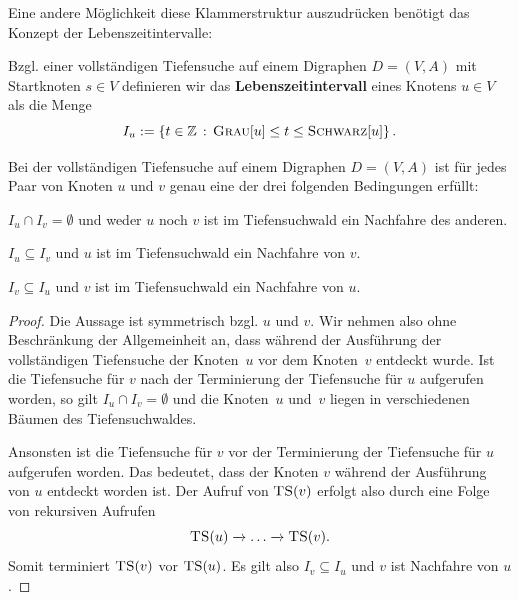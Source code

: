 \begin{bem} 	
Eine andere Möglichkeit diese Klammerstruktur auszudrücken benötigt das Konzept der Lebenszeitintervalle:
\end{bem}

\begin{defn}
	Bzgl. einer vollständigen Tiefensuche auf einem Digraphen $D=(V,A)$ mit Startknoten $s \in V$ definieren wir das \textbf{Lebenszeitintervall} eines Knotens $u \in V$ als die Menge
	\[
			I_u:=\left\{ t \in \mathbb{Z} \,:\,  \mathop{\text{\textsc{Grau}}}[u] \le t \le \mathop{\text{\textsc{Schwarz}}}[u] \right\}. 
	\]
\end{defn} 

\begin{thm}[Klammerungstheorem]
\label{thm:klammerung}
Bei der vollständigen Tiefensuche auf einem Digraphen $D=(V,A)$ ist für jedes Paar von Knoten $u$ und $v$ genau eine der drei folgenden Bedingungen erfüllt:
\begin{enuma}

 \item $I_u \cap I_v = \emptyset$  und weder $u$ noch $v$ ist im Tiefensuchwald ein Nachfahre des anderen.

 \item $I_u \subseteq I_v$ und $u$ ist im Tiefensuchwald ein Nachfahre von $v$.

 \item $I_v \subseteq I_u$ und $v$ ist im Tiefensuchwald ein Nachfahre von $u$.

\end{enuma}
\end{thm}
\begin{proof}
	Die Aussage ist symmetrisch bzgl. $u$ und $v$. Wir  nehmen also ohne Beschränkung der Allgemeinheit an, dass während der Ausführung der vollständigen Tiefensuche der Knoten~$u$ vor dem Knoten~$v$ entdeckt wurde. Ist die Tiefensuche für $v$ nach der Terminierung der Tiefensuche für $u$ aufgerufen worden, so gilt $I_u \cap I_v = \emptyset$ und die Knoten~$u$ und~$v$ liegen in verschiedenen Bäumen des Tiefensuchwaldes.
	
	Ansonsten ist die Tiefensuche für $v$ vor der Terminierung der Tiefensuche für $u$ aufgerufen worden. Das bedeutet, dass der Knoten $v$ während der Ausführung von $u$ entdeckt worden ist. Der Aufruf von $\mathop{\text{\textsc{TS}}}(v)$ erfolgt also durch eine Folge von rekursiven Aufrufen 
	\[
		\mathop{\text{\textsc{TS}}}(u) \xrightarrow{} \ldots \xrightarrow{} \mathop{\text{\textsc{TS}}}(v) .
	\] 
	Somit terminiert $\mathop{\text{\textsc{TS}}}(v)$ vor $\mathop{\text{\textsc{TS}}}(u)$. Es gilt also $I_v \subseteq I_u$ und $v$ ist Nachfahre von $u$. 
\end{proof}



